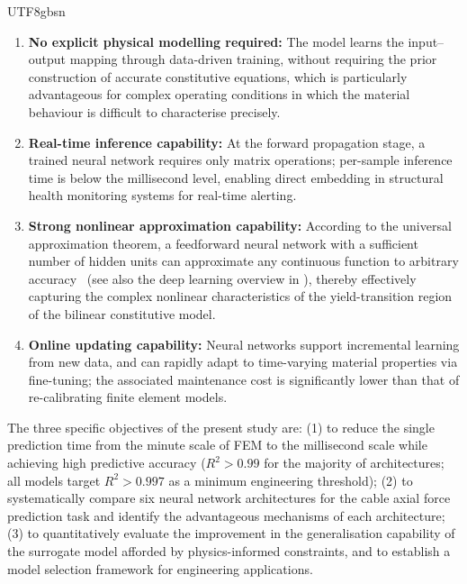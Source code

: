 \documentclass[a4paper,12pt]{report}
\begin{document}
\begin{CJK}{UTF8}{gbsn}
\begin{enumerate}
  \item \textbf{No explicit physical modelling required:} The model learns the
    input--output mapping through data-driven training, without requiring the prior
    construction of accurate constitutive equations, which is particularly advantageous
    for complex operating conditions in which the material behaviour is difficult to
    characterise precisely.
  \item \textbf{Real-time inference capability:} At the forward propagation stage, a
    trained neural network requires only matrix operations; per-sample inference time is
    below the millisecond level, enabling direct embedding in structural health monitoring
    systems for real-time alerting.
  \item \textbf{Strong nonlinear approximation capability:} According to the universal
    approximation theorem, a feedforward neural network with a sufficient number of hidden
    units can approximate any continuous function to arbitrary accuracy~\cite{hornik1991}
    (see also the deep learning overview in \cite{lecun2015}),
    thereby effectively capturing the complex nonlinear characteristics of the
    yield-transition region of the bilinear constitutive model.
  \item \textbf{Online updating capability:} Neural networks support incremental learning
    from new data, and can rapidly adapt to time-varying material properties via
    fine-tuning; the associated maintenance cost is significantly lower than that of
    re-calibrating finite element models.
\end{enumerate}

The three specific objectives of the present study are: (1) to reduce the single
prediction time from the minute scale of FEM to the millisecond scale while achieving
high predictive accuracy ($R^2 > 0.99$ for the majority of architectures; all models
target $R^2 > 0.997$ as a minimum engineering threshold); (2) to systematically compare
six neural network architectures for the cable axial force prediction task and identify
the advantageous mechanisms of each architecture; (3) to quantitatively evaluate the
improvement in the generalisation capability of the surrogate model afforded by
physics-informed constraints, and to establish a model selection framework for
engineering applications.


\end{CJK}
\end{document}
